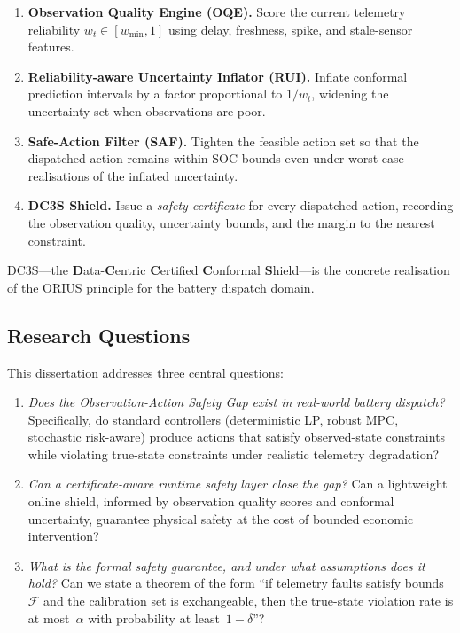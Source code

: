 \begin{enumerate}
  \item \textbf{Observation Quality Engine (OQE).}  Score the current
    telemetry reliability $w_t \in [w_{\min}, 1]$ using delay, freshness,
    spike, and stale-sensor features.
  \item \textbf{Reliability-aware Uncertainty Inflator (RUI).}  Inflate
    conformal prediction intervals by a factor proportional to $1/w_t$,
    widening the uncertainty set when observations are poor.
  \item \textbf{Safe-Action Filter (SAF).}  Tighten the feasible action
    set so that the dispatched action remains within SOC bounds even under
    worst-case realisations of the inflated uncertainty.
  \item \textbf{DC3S Shield.}  Issue a \emph{safety certificate} for
    every dispatched action, recording the observation quality, uncertainty
    bounds, and the margin to the nearest constraint.
\end{enumerate}

DC3S---the \textbf{D}ata-\textbf{C}entric \textbf{C}ertified
\textbf{C}onformal \textbf{S}hield---is the concrete realisation of the
ORIUS principle for the battery dispatch domain.

\subsection{Research Questions}

This dissertation addresses three central questions:

\begin{enumerate}
  \item[\textbf{RQ1.}] \emph{Does the Observation-Action Safety Gap exist
    in real-world battery dispatch?}  Specifically, do standard controllers
    (deterministic LP, robust MPC, stochastic risk-aware) produce actions
    that satisfy observed-state constraints while violating true-state
    constraints under realistic telemetry degradation?
  \item[\textbf{RQ2.}] \emph{Can a certificate-aware runtime safety layer
    close the gap?}  Can a lightweight online shield, informed by
    observation quality scores and conformal uncertainty, guarantee
    physical safety at the cost of bounded economic intervention?
  \item[\textbf{RQ3.}] \emph{What is the formal safety guarantee, and
    under what assumptions does it hold?}  Can we state a theorem of the
    form ``if telemetry faults satisfy bounds~$\mathcal{F}$ and the
    calibration set is exchangeable, then the true-state violation rate is
    at most~$\alpha$ with probability at least~$1 - \delta$''?
\end{enumerate}

